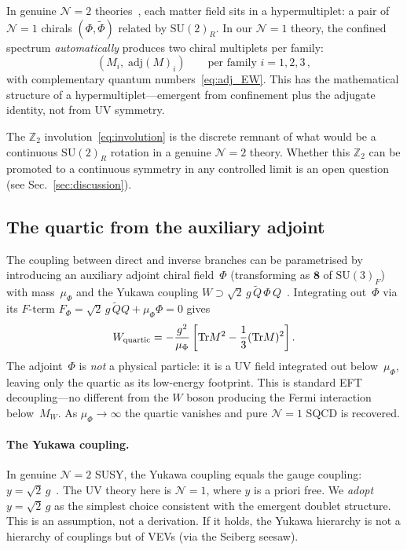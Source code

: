 \documentclass[aps,prd,twocolumn,showpacs,preprintnumbers,superscriptaddress,floatfix]{revtex4-2}
\newcommand{\SU}{\mathrm{SU}}
\newcommand{\Tr}{\mathrm{Tr}}
\newcommand{\adj}{\mathrm{adj}}
\begin{document}
In genuine $\mathcal{N}{=}2$
theories~\cite{SeibergWitten:1994a,Fayet:1976}, each matter field
sits in a hypermultiplet: a pair of $\mathcal{N}{=}1$ chirals
$(\Phi, \tilde{\Phi})$ related by $\SU(2)_R$.
In our $\mathcal{N}{=}1$ theory, the confined spectrum
\emph{automatically} produces two chiral multiplets per family:
\begin{equation}
  (M_i, \;\adj(M)_i)
  \qquad\text{per family } i = 1, 2, 3\,,
\end{equation}
with complementary quantum numbers~\eqref{eq:adj_EW}.
This has the mathematical structure of a hypermultiplet---emergent
from confinement plus the adjugate identity, not from UV symmetry.

The $\mathbb{Z}_2$ involution~\eqref{eq:involution} is the discrete
remnant of what would be a continuous $\SU(2)_R$ rotation in a
genuine $\mathcal{N}{=}2$ theory.
Whether this $\mathbb{Z}_2$ can be promoted to a continuous symmetry
in any controlled limit is an open question
(see Sec.~\ref{sec:discussion}).


\subsection{The quartic from the auxiliary adjoint}

The coupling between direct and inverse branches can be parametrised
by introducing an auxiliary adjoint chiral field~$\Phi$
(transforming as $\mathbf{8}$ of $\SU(3)_F$) with
mass~$\mu_\Phi$ and the Yukawa coupling
$W \supset \sqrt{2}\,g\,\tilde{Q}\,\Phi\,Q$~\cite{HMS:1997}.
Integrating out~$\Phi$ via its $F$-term
$F_\Phi = \sqrt{2}\,g\,\tilde{Q}Q + \mu_\Phi\Phi = 0$ gives
\begin{equation}
  W_{\rm quartic}
  = -\frac{g^2}{\mu_\Phi}
    \left[\Tr M^2
    - \frac{1}{3}(\Tr M)^2\right].
  \label{eq:quartic}
\end{equation}
The adjoint~$\Phi$ is \emph{not} a physical particle: it is a UV
field integrated out below~$\mu_\Phi$, leaving only the quartic as
its low-energy footprint.
This is standard EFT decoupling---no different from the $W$ boson
producing the Fermi interaction below~$M_W$.
As $\mu_\Phi \to \infty$ the quartic vanishes and pure
$\mathcal{N}{=}1$ SQCD is recovered.

\paragraph{The Yukawa coupling.}
In genuine $\mathcal{N}{=}2$ SUSY, the Yukawa coupling equals the
gauge coupling: $y = \sqrt{2}\,g$~\cite{Fayet:1976,SeibergWitten:1994a}.
The UV theory here is $\mathcal{N}{=}1$, where $y$ is a priori free.
We \emph{adopt} $y = \sqrt{2}\,g$ as the simplest choice consistent
with the emergent doublet structure.
This is an assumption, not a derivation.
If it holds, the Yukawa hierarchy is not a hierarchy of couplings
but of VEVs (via the Seiberg seesaw).
\end{document}
